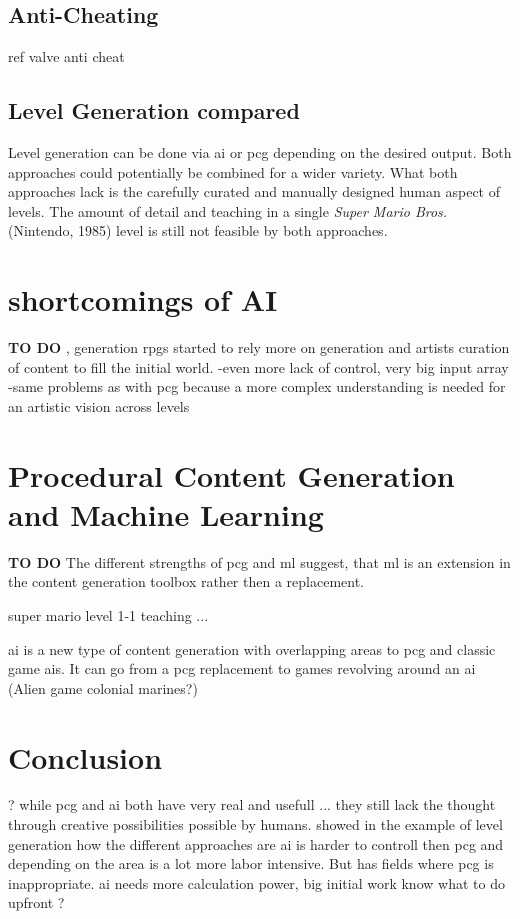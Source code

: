 \documentclass[10pt,a4paper]{article}
\begin{document}
\subsection{Anti-Cheating}
ref valve anti cheat

\subsection{Level Generation compared}
Level generation can be done via \gls{ai} or \gls{pcg} depending on the desired output. Both approaches could potentially be combined for a wider variety. What both approaches lack is the carefully curated and manually designed human aspect of levels. The amount of detail and teaching in a single \textit{Super Mario Bros.} (Nintendo, 1985) level\cite{EurogamerMiyamotoInterview} is still not feasible by both approaches.

\section{shortcomings of AI}
\textbf{TO DO}
, generation \gls{rpg}s started to rely more on generation and artists curation of content to fill the initial world.
-even more lack of control, very big input array
-same problems as with \gls{pcg} because a more complex understanding is needed for an artistic vision across levels

\section{Procedural Content Generation and Machine Learning}
\textbf{TO DO}
The different strengths of \gls{pcg} and \gls{ml} suggest, that \gls{ml} is an extension in the content generation toolbox rather then a replacement.

super mario level 1-1 teaching ...

\gls{ai} is a new type of content generation with overlapping areas to \gls{pcg} and classic game \gls{ai}s. It can go from a \gls{pcg} replacement to games revolving around an \gls{ai} (Alien game colonial marines?)

\section{Conclusion}

?
while pcg and ai both have very real and usefull ... they still lack the thought through creative possibilities possible by humans.
showed in the example of level generation how the different approaches are
ai is harder to controll then \gls{pcg} and depending on the area is a lot more labor intensive. But has fields where \gls{pcg} is inappropriate.
ai needs more calculation power, big initial work
know what to do upfront
?
\end{document}
